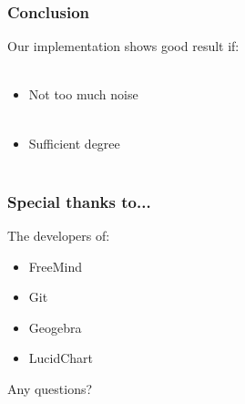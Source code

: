 \documentclass{beamer}
\begin{document}
\begin{frame}
    \frametitle{Conclusion}
    Our implementation shows good result if: \\~
    \begin{itemize}
        \item Not too much noise \\~
        \item Sufficient degree \\~
    \end{itemize}
\end{frame}
\begin{frame}
    \frametitle{Special thanks to...}
    The developers of:
    \begin{itemize}
        \item FreeMind
        \item Git
        \item Geogebra
        \item LucidChart
    \end{itemize}
\end{frame}

\begin{frame}
    Any questions?
\end{frame}
\end{document}
